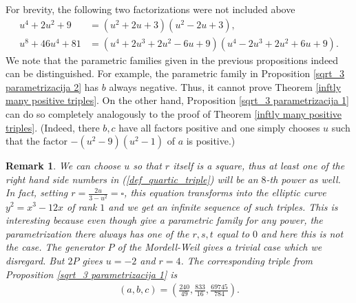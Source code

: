 \documentclass{amsart}
\newtheorem{remark}{Remark}
\begin{document}
For brevity, the following two factorizations were not included above
\begin{align*}
   u^4+2u^2+9 &=  (u^2+2u+3)(u^2-2u+3), \\
   u^8 + 46u^4 + 81 &= (u^4 + 2u^3 + 2u^2 - 6u + 9)(u^4 - 2u^3 + 2u^2 + 6u + 9).
\end{align*}
We note that the parametric families given in the previous propositions indeed can be distinguished. For example, the parametric family in Proposition \ref{sqrt_3 parametrizacija 2} has $b$ always negative. Thus, it cannot prove Theorem \ref{inftly many positive triples}. On the other hand, Proposition \ref{sqrt_3 parametrizacija 1} can do so completely analogously to the proof of Theorem \ref{inftly many positive triples}. (Indeed, there $b,c$ have all factors positive and one simply chooses $u$ such that the factor $-(u^2-9)(u^2-1)$ of $a$ is positive.) 

\begin{remark}
    We can choose $u$ so that $r$ itself is a square, thus at least one of the right hand side numbers in (\ref{def_quartic_triple}) will be an $8$-th power as well. In fact, setting $r=\frac{2u}{3-u^2}=\square$, this equation transforms into the elliptic curve $y^2=x^3-12x$ of rank $1$ and we get an infinite sequence of such triples. This is interesting because even though \cite{batta2025higher} give a parametric family for any power, the parametrization there always has one of the $r,s,t$ equal to $0$ and here this is not the case. The generator $P$ of the Mordell-Weil gives a trivial case which we disregard. But $2P$ gives $u=-2$ and $r=4$. The corresponding triple from Proposition \ref{sqrt_3 parametrizacija 1} is
    \begin{align*}
        (a,b,c) = \left( \frac{240}{49},
        \frac{833}{16}, \frac{69745}{784}\right).
    \end{align*}
\end{remark}
\end{document}
